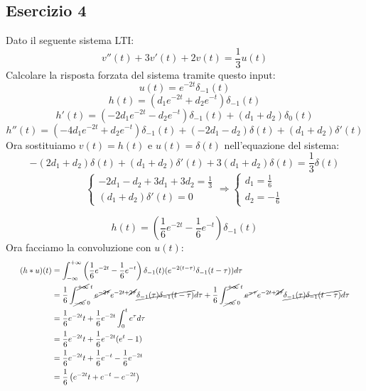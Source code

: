 \documentclass[a4paper]{article}
\begin{document}
\subsection{Esercizio 4}

Dato il seguente sistema LTI:
\[v''(t) + 3v'(t) + 2v(t) = \frac{1}{3}u(t)\]
Calcolare la risposta forzata del sistema tramite questo input:
\[u(t) = e^{-2t}\delta_{-1}(t)\]
\[h(t) = (d_1e^{-2t} + d_2e^{-t})\delta_{-1}(t)\]
\[h'(t) = (-2d_1e^{-2t} - d_2e^{-t})\delta_{-1}(t) +(d_1 + d_2)\delta_0(t)\]
\[h''(t) = (-4d_1e^{-2t} + d_2e^{-t})\delta_{-1}(t) + (-2d_1 - d_2)\delta(t) + (d_1 + d_2)\delta'(t) \]
Ora sostituiamo $v(t) = h(t)$ e $u(t) = \delta(t)$ nell'equazione del sistema:
\[-(2d_1 + d_2)\delta(t) + (d_1 + d_2)\delta'(t) + 3(d_1 + d_2)\delta(t) = \frac{1}{3}\delta(t)\]
\[\begin{cases}
    - 2d_1 - d_2 + 3d_1 + 3d_2 = \frac{1}{3}\\
    (d_1 + d_2)\delta'(t) = 0
\end{cases} \Longrightarrow 
\begin{cases}
    d_1 = \frac{1}{6}\\
    d_2 = -\frac{1}{6}
\end{cases}
\]

\[h(t) = \left(\frac{1}{6}e^{-2t} - \frac{1}{6}e^{-t}\right)\delta_{-1}(t)\]
Ora facciamo la convoluzione con $u(t)$:
\begin{equation*}
    \scalebox{0.8}
    {
    $\begin{aligned}
        (h \ast u)(t) &= \int_{-\infty}^{+\infty} \left(\frac{1}{6}e^{-2t} - \frac{1}{6}e^{-t}\right)\delta_{-1}(t)(e^{-2(t-\tau)}\delta_{-1}(t-\tau))d\tau\\
        &= \frac{1}{6}\int_{\cancel{-\infty}\;0}^{\cancel{+\infty}\;t} \cancel{e^{-2\tau}}e^{-2t+\cancel{2\tau}}\cancel{\delta_{-1}(\tau)\delta_{-1}(t-\tau)}d\tau + \frac{1}{6}\int_{\cancel{-\infty}\;0}^{\cancel{+\infty}\;t} \cancel{e^{-\tau}}e^{-2t+\cancel{2\tau}}\cancel{\delta_{-1}(\tau)\delta_{-1}(t-\tau)}d\tau\\
        &= \frac{1}{6}e^{-2t}t + \frac{1}{6}e^{-2t}\int_{0}^{t} e^{\tau}d\tau\\
        &= \frac{1}{6}e^{-2t}t + \frac{1}{6}e^{-2t}(e^t-1)\\
        &= \frac{1}{6}e^{-2t}t + \frac{1}{6}e^{-t} - \frac{1}{6}e^{-2t}\\
        &= \frac{1}{6}\left(e^{-2t}t + e^{-t} - e^{-2t}\right)
    \end{aligned}$
    }
\end{equation*}
\end{document}
